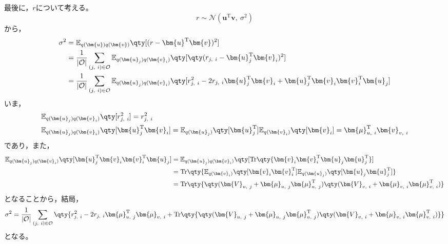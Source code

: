 \documentclass[class=jsarticle, crop=false, dvipdfmx, fleqn]{standalone}
\begin{document}
最後に，\(r\)について考える。
\begin{equation}
    r \sim \mathcal{N}(\bm{u}^\mathrm{T} \bm{v},\ \sigma^2)
\end{equation}
から，
\begin{align}
    \sigma^2
        & = \mathbb{E}_{q(\bm{u}) q(\bm{v})} \qty[(r - \bm{u}^\mathrm{T} \bm{v})^2] \\
        & = \frac{1}{|\mathcal{O}|} \sum_{(j,\ i) \in \mathcal{O}} \mathbb{E}_{q(\bm{u}_j) q(\bm{v}_i)} \qty[\qty(r_{j,\ i} - \bm{u}_j^\mathrm{T} \bm{v}_i)^2] \\
        & = \frac{1}{|\mathcal{O}|} \sum_{(j,\ i) \in \mathcal{O}} \mathbb{E}_{q(\bm{u}_j) q(\bm{v}_i)} \qty[r_{j,\ i}^2 - 2 r_{j,\ i} \bm{u}_j^\mathrm{T} \bm{v}_i + \bm{u}_j^\mathrm{T} \bm{v}_i \bm{v}_i^\mathrm{T} \bm{u}_j] \\
\end{align}
いま，
\begin{align}
    & \mathbb{E}_{q(\bm{u}_j) q(\bm{v}_i)} \qty[r_{j,\ i}^2]
        = r_{j,\ i}^2 \\
    & \mathbb{E}_{q(\bm{u}_j) q(\bm{v}_i)} \qty[\bm{u}_j^\mathrm{T} \bm{v}_i]
        = \mathbb{E}_{q(\bm{u}_j)} \qty[\bm{u}_j^\mathrm{T}] \mathbb{E}_{q(\bm{v}_i)} \qty[\bm{v}_i]
        = \bm{\mu}_{u,\ i}^\mathrm{T} \bm{v}_{v,\ i}
\end{align}
であり，また，
\begin{align}
    \mathbb{E}_{q(\bm{u}_j) q(\bm{v}_i)} \qty[\bm{u}_j^\mathrm{T} \bm{v}_i \bm{v}_i^\mathrm{T} \bm{u}_j]
        & = \mathbb{E}_{q(\bm{u}_j) q(\bm{v}_i)} \qty[\mathrm{Tr}\qty{\bm{v}_i \bm{v}_i^\mathrm{T} \bm{u}_j \bm{u}_j^\mathrm{T}}] \\
        & = \mathrm{Tr} \qty{\mathbb{E}_{q(\bm{v}_i)} \qty[\bm{v}_i \bm{v}_i^\mathrm{T}] \mathbb{E}_{q(\bm{u}_j)} \qty[\bm{u}_j \bm{u}_j^\mathrm{T}]} \\
        & = \mathrm{Tr} \qty{\qty(\bm{V}_{u,\ j} + \bm{\mu}_{u,\ j} \bm{\mu}_{u,\ j}^\mathrm{T}) \qty(\bm{V}_{v,\ i} + \bm{\mu}_{v,\ i} \bm{\mu}_{v,\ i}^\mathrm{T})}
\end{align}
となることから，結局，
\begin{equation}
    \sigma^2
        = \frac{1}{|\mathcal{O}|} \sum_{(j,\ i) \in \mathcal{O}} \qty{
            r_{j,\ i}^2 - 2 r_{j,\ i} \bm{\mu}_{u,\ j}^\mathrm{T} \bm{\mu}_{v,\ i} + \mathrm{Tr} \qty{\qty(\bm{V}_{u,\ j} + \bm{\mu}_{u,\ j} \bm{\mu}_{u,\ j}^\mathrm{T}) \qty(\bm{V}_{v,\ i} + \bm{\mu}_{v,\ i} \bm{\mu}_{v,\ i}^\mathrm{T})}} \\
\end{equation}
となる。
\end{document}
